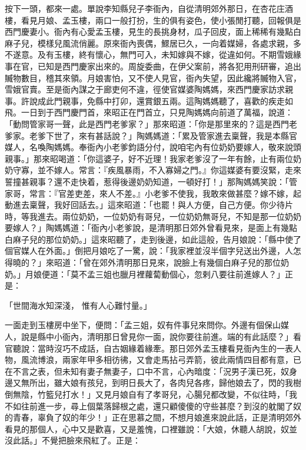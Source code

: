 按下一頭，都來一處。單說李知縣兒子李衙內，自從清明郊外那日，在杏花庄酒樓，看見月娘、孟玉樓，兩口一般打扮，生的俱有姿色，使小張閒打聽，回報俱是西門慶妻小。衙內有心愛孟玉樓，見生的長挑身材，瓜子回皮，面上稀稀有幾點白麻子兒，模樣兒風流俏麗。原來衙內喪偶，鰥居已久，一向着媒婦，各處求親，多不遂意。及有玉樓，終有懷心，無門可入，未知嫁與不嫁，從違如何。不期雪娥緣事在官，已知是西門慶家出來的。周旋委曲，在伊父案前，將各犯用刑研審，追出贓物數目，稽其來領。月娘害怕，又不使人見官，衙內失望，因此纔將贓物入官，雪娥官賣。至是衙內謀之于廊吏何不違，徑使官媒婆陶媽媽，來西門慶家訪求親事。許說成此門親事，免縣中打卯，還賞銀五兩。這陶媽媽聽了，喜歡的疾走如飛。一日到于西門慶門首，來昭正在門首立，只見陶媽媽向前道了萬福，說道：「動問管家哥一聲，此是西門老爹家？」那來昭道：「你是那里來的？這是西門老爹家。老爹下世了，來有甚話說？」陶媽媽道：「累及管家進去稟聲，我是本縣官媒人，名喚陶媽媽。奉衙內小老爹鈞語分付，說咱宅內有位奶奶要嫁人，敬來說頭親事。」那來昭喝道：「你這婆子，好不近理！我家老爹沒了一年有餘，止有兩位奶奶守寡，並不嫁人。常言：『疾風暴雨，不入寡婦之門。』你這媒婆有要沒緊，走來誓撞甚親事？還不走快着，惹得後邊奶奶知道，一頓好打！」那陶媽媽笑說：「管家哥，常言：『官差吏差，來人不差。』小老爹不使我，我敢來做甚麼？嫁不嫁，起動進去稟聲，我好回話去。」這來昭道：「也罷！與人方便，自己方便。你少待片時，等我進去。兩位奶奶，一位奶奶有哥兒，一位奶奶無哥兒，不知是那一位奶奶要嫁人？」陶媽媽道：「衙內小老爹說，是清明那日郊外曾看見來，是面上有幾點白麻子兒的那位奶奶。」這來昭聽了，走到後邊，如此這般，告月娘說：「縣中使了個官媒人在外面。」倒把月娘吃了一驚，說：「我家裡並沒半個字兒送出外邊，人怎得曉的？」來昭道：「曾在郊外清明那日見來，說臉上有幾個白麻子兒的那位奶奶。」月娘便道：「莫不孟三姐也臘月裡蘿蔔動個心，忽剌八要往前進嫁人？」正是：

「世間海水知深淺，  惟有人心難忖量。」

一面走到玉樓房中坐下，便問：「孟三姐，奴有件事兒來問你。外邊有個保山媒人，說是縣中小衙內，清明那日曾見你一面，說你要往前進。端的有此話麼？」看官聽說：當時沒巧不成話，自古姻緣着緣牽。那日郊外孟玉樓看見衙內生的一表人物，風流博浪，兩家年甲多相彷彿，又會走馬拈弓弄箭，彼此兩情四目都有意，已在不言之表，但未知有妻子無妻子，口中不言，心內暗度：「況男子漢已死，奴身邊又無所出，雖大娘有孩兒，到明日長大了，各肉兒各疼，歸他娘去了，閃的我樹倒無陰，竹籃兒打水！」又見月娘自有了孝哥兒，心腸兒都改變，不似往時，「我不如往前進一步，尋上個葉落歸根之處，還只顧傻傻的守些甚麼？到沒的躭閣了奴的青春，辜負了奴的年少！」正在思慕之間，不想月娘進來說此話，正是清明郊外看見的那個人，心中又是歡喜，又是羞愧，口裡雖說：「大娘，休聽人胡說，奴並沒此話。」不覺把臉來飛紅了。正是：

